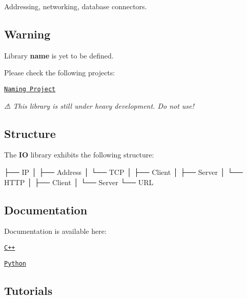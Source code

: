 Addressing, networking, database connectors.

\href{https://travis-ci.com/open-space-collective/library-io}{\tt } \href{https://codecov.io/gh/open-space-collective/library-io}{\tt } \href{https://open-space-collective.github.io/library-io}{\tt } \href{https://badge.fury.io/gh/open-space-collective%2Flibrary-io}{\tt } \href{https://badge.fury.io/py/LibraryIOPy}{\tt } \href{https://opensource.org/licenses/Apache-2.0}{\tt }

\subsection*{Warning}

Library {\bfseries name} is yet to be defined.

Please check the following projects\+:


\begin{DoxyItemize}
\item \href{https://github.com/orgs/open-space-collective/projects/1}{\tt Naming Project}
\end{DoxyItemize}

{\itshape ⚠ This library is still under heavy development. Do not use!}

\subsection*{Structure}

The {\bfseries IO} library exhibits the following structure\+:


\begin{DoxyCode}
├── IP
│   ├── Address
│   └── TCP
│       ├── Client
│       ├── Server
│       └── HTTP
│           ├── Client
│           └── Server
└── URL
\end{DoxyCode}


\subsection*{Documentation}

Documentation is available here\+:


\begin{DoxyItemize}
\item \href{https://open-space-collective.github.io/library-io}{\tt C++}
\item \href{./bindings/python/docs}{\tt Python}
\end{DoxyItemize}

\subsection*{Tutorials}

